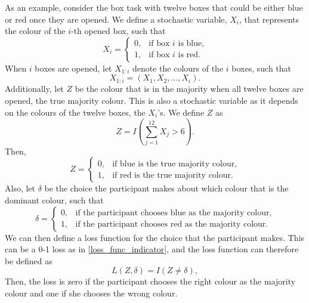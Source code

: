 As an example, consider the box task with twelve boxes that could be either blue or red once they are opened. We define a stochastic variable, $X_i$, that represents the colour of the $i$-th opened box, such that 
\begin{equation}
\label{def_of_Xi}
    X_i =
    \begin{cases}
        0,& \text{if box }i \text{ is blue,}\\
        1,& \text{if box }i \text{ is red.}
    \end{cases}
\end{equation}
When $i$ boxes are opened, let $X_{1:i}$ denote the colours of the $i$ boxes, such that
\begin{equation}
\label{def_of_X1:i}
    X_{1:i} = (X_1,X_2,...,X_{i}).
\end{equation}
Additionally, let $Z$ be the colour that is in the majority when all twelve boxes are opened, the true majority colour. This is also a stochastic variable as it depends on the colours of the twelve boxes, the $X_i$'s. We define $Z$ as
\begin{equation}
\label{def_of_Z}
    Z = I\left(\sum_{j=1}^{12}X_j > 6\right).
\end{equation}
Then,
\begin{equation}
\label{Z_true_majority}
    Z = 
    \begin{cases}
        0,& \text{if blue is the true majority colour,} \\
        1,& \text{if red is the true majority colour.}
    \end{cases}
\end{equation}
Also, let $\delta$ be the choice the participant makes about which colour that is the dominant colour, such that
\begin{equation*}
    \delta = 
    \begin{cases}
        0,& \text{if the participant chooses blue as the majority colour,}\\
        1,& \text{if the participant chooses red as the majority colour}.
    \end{cases}
\end{equation*}
We can then define a loss function for the choice that the participant makes. This can be a 0-1 loss as in \eqref{loss_func_indicator}, and the loss function can therefore be defined as 
\begin{equation}
\label{loss_func_example}
    L(Z,\delta) = I(Z \neq \delta),
\end{equation}
Then, the loss is zero if the participant chooses the right colour as the majority colour and one if she chooses the wrong colour. 

